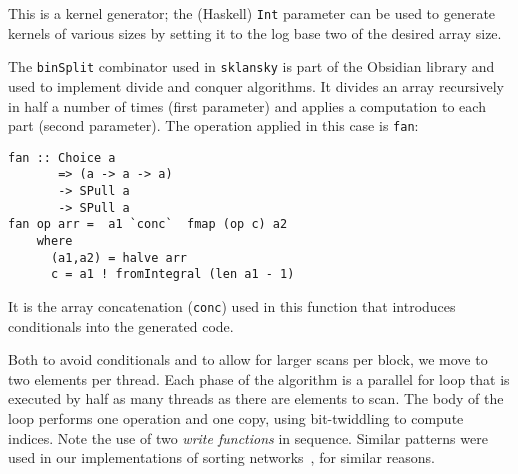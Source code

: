 This is a kernel generator;
the (Haskell) {\tt Int} parameter can be used to generate kernels of various sizes by setting 
it to the log base two of the desired array size. 

The {\tt binSplit} combinator used in {\tt sklansky} is part of the Obsidian library 
and used to implement divide and conquer algorithms. It divides an array recursively in half 
a number of times (first parameter) and applies a computation to each part (second parameter). 
The operation applied in this case is {\tt fan}: 

\begin{small}
\begin{Verbatim}[samepage=true]
fan :: Choice a
       => (a -> a -> a)
       -> SPull a
       -> SPull a
fan op arr =  a1 `conc`  fmap (op c) a2 
    where 
      (a1,a2) = halve arr
      c = a1 ! fromIntegral (len a1 - 1)
\end{Verbatim}
\end{small}

It is the array concatenation ({\tt conc}) used in this function that introduces 
conditionals into the generated code. 





Both to avoid conditionals and to allow
for larger scans per block, we move to two elements per thread.
Each phase of the algorithm is a parallel for loop that is executed 
by half as many threads as there are elements to scan. The body of the loop
performs one operation and one copy, using bit-twiddling to compute indices.
Note the use of two {\em write functions} in sequence.
Similar patterns were used in our implementations of sorting networks~\cite{Obsidian-Expressive}, for similar reasons.


